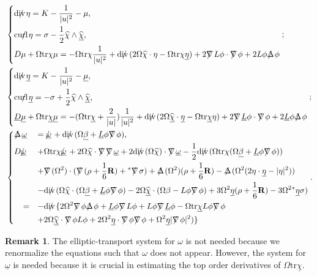 \documentclass[11pt,reqno]{amsart}
\theoremstyle{definition}
\newtheorem{remark}{Remark}[section]
\numberwithin{equation}{section}
\newcommand{\tr}{\mathrm{tr}}
\def\betab{\underline{\beta}}
\def\chib{\underline{\chi}}
\def\chibh{\widehat{\underline{\chi}}}
\def\chih{\widehat{\chi}}
\def\etab{\underline{\eta}}
\def\Lb{\underline{L}}
\def\mub{\underline{\mu}}
\def\tr{\mathrm{tr}}
\def\omegab{\underline{\omega}}
\newcommand{\Db}{\underline{D}}
\def\nablas{\mbox{$\nabla \mkern -13mu /$ }}
\def\Deltas{\mbox{$\Delta \mkern -13mu /$ }}
\def\divs{\mbox{$\mathrm{div} \mkern -13mu /$ }}
\def\curls{\mbox{$\mathrm{curl} \mkern -13mu /$ }}
\def\omegas{\mbox{$\omega \mkern -13mu /$ }}
\def\omegabs{\mbox{$\omegab \mkern -13mu /$ }}
\def\ds{\mbox{$\nabla \mkern -13mu /$ }}
\begin{document}
\begin{align*}
&\begin{dcases}\divs\eta=K-\frac{1}{|u|^2}-\mu,\\
\curls\eta=\sigma-\frac{1}{2}\chih\wedge\chibh,\\
D\mu+\Omega\tr\chi\mu=-\Omega\tr\chi\frac{1}{|u|^2}+\divs(2\Omega\chih\cdot\eta-\Omega\tr\chi\etab)+2\nablas L\phi\cdot\ds\phi+2L\phi\Deltas\phi\end{dcases};\\
&\begin{dcases}
\divs\etab=K-\frac{1}{|u|^2}-\mub,\\
\curls\etab=-\sigma+\frac{1}{2}\chih\wedge\chibh,\\
\Db\mub+\Omega\tr\chib\mub=-(\Omega\tr\chib+\frac{2}{|u|})\frac{1}{|u|^2}+\divs(2\Omega\chibh\cdot\etab-\Omega\tr\chib\eta)+2\nablas \Lb\phi\cdot\ds\phi+2\Lb\phi\Deltas\phi\end{dcases};\\
&\begin{dcases}\Deltas\omegab&=\omegabs+\divs(\Omega\betab+\Lb\phi\nablas\phi),\\
D\omegabs&+\Omega\tr\chi\omegabs+2\Omega\chih\cdot\nablas\nablas\omegab+2\divs(\Omega\chih)\cdot\nablas\omegab-\frac{1}{2}\divs(\Omega\tr\chi(\Omega\betab+\Lb\phi\nablas\phi))\\
&+\nablas(\Omega^2)\cdot(\ds(\rho+\frac{1}{6}\mathbf{R})+{}^*\ds\sigma)+\Deltas(\Omega^2)(\rho+\frac{1}{6}\mathbf{R})-\Deltas(\Omega^2(2\eta\cdot\etab-|\eta|^2))\\
&-\divs(\Omega\chih\cdot(\Omega\betab+\Lb\phi\nablas\phi)-2\Omega\chibh\cdot(\Omega\beta-L\phi\nablas\phi)+3\Omega^2\etab(\rho+\frac{1}{6}\mathbf{R})-3\Omega^2{}^*\etab\sigma)\\
\phantom{\Delta}=&-\divs\{2\Omega^2\ds\phi\Deltas\phi+\Lb\phi\nablas L\phi+L\phi\nablas\Lb\phi-\Omega\tr\chib L\phi\ds\phi\\
&+2\Omega\chibh\cdot\ds\phi L\phi+2\Omega^2\etab\cdot\nablas\phi\ds\phi+\Omega^2\etab|\ds\phi|^2)\}\end{dcases}.
\end{align*}
\begin{remark}
The elliptic-transport system for $\omega$ is not needed because we renormalize the equations such that $\omega$ does not appear. However, the system for $\omegab$ is needed because it is crucial in estimating the top order derivatives of $\Omega\tr\chib$.
\end{remark}
\end{document}
